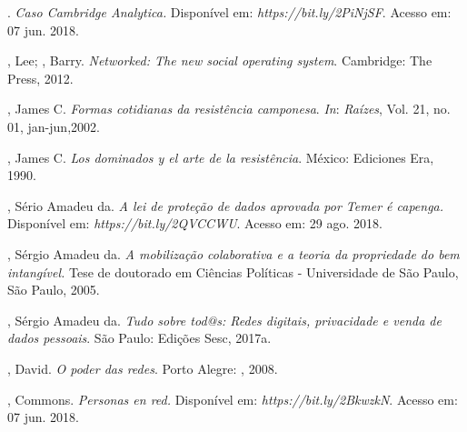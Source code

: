 . \emph{Caso Cambridge Analytica.} Disponível em:
\emph{https://bit.ly/2PiNjSF}. Acesso em: 07 jun. 2018.

, Lee; , Barry. \emph{Networked: The new social
operating system}. Cambridge: The  Press, 2012.

, James C. \emph{Formas cotidianas da resistência camponesa}. \emph{In}:
\emph{Raízes}, Vol. 21, no. 01, jan-jun,2002.

, James C. \emph{Los dominados y el arte de la resistência}.
México: Ediciones Era, 1990.

, Sério Amadeu da. \emph{A lei de proteção de dados aprovada
por Temer é capenga.} Disponível em: \emph{https://bit.ly/2QVCCWU}. Acesso em: 29 ago. 2018.

, Sérgio Amadeu da. \emph{A mobilização colaborativa e a
teoria da propriedade do bem intangível.} Tese de doutorado em Ciências
Políticas - Universidade de São Paulo, São Paulo, 2005.

, Sérgio Amadeu da. \emph{Tudo sobre tod@s: Redes digitais,
privacidade e venda de dados pessoais}. São Paulo: Edições Sesc, 2017a.

, David. \emph{O poder das redes}. Porto Alegre: , 2008.

, Commons. \emph{Personas en red.} Disponível em:
\emph{https://bit.ly/2BkwzkN}. Acesso em: 07 jun. 2018.
